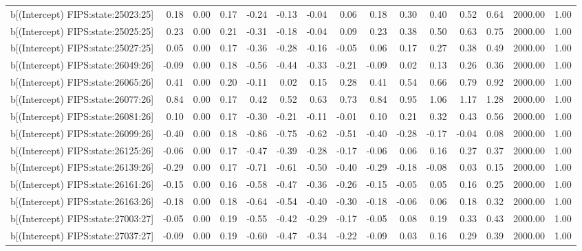 \begin{table}[ht]
\begin{tabular}{rrrrrrrrrrrrrrr}
  b[(Intercept) FIPS:state:25023:25] & 0.18 & 0.00 & 0.17 & -0.24 & -0.13 & -0.04 & 0.06 & 0.18 & 0.30 & 0.40 & 0.52 & 0.64 & 2000.00 & 1.00 \\ 
  b[(Intercept) FIPS:state:25025:25] & 0.23 & 0.00 & 0.21 & -0.31 & -0.18 & -0.04 & 0.09 & 0.23 & 0.38 & 0.50 & 0.63 & 0.75 & 2000.00 & 1.00 \\ 
  b[(Intercept) FIPS:state:25027:25] & 0.05 & 0.00 & 0.17 & -0.36 & -0.28 & -0.16 & -0.05 & 0.06 & 0.17 & 0.27 & 0.38 & 0.49 & 2000.00 & 1.00 \\ 
  b[(Intercept) FIPS:state:26049:26] & -0.09 & 0.00 & 0.18 & -0.56 & -0.44 & -0.33 & -0.21 & -0.09 & 0.02 & 0.13 & 0.26 & 0.36 & 2000.00 & 1.00 \\ 
  b[(Intercept) FIPS:state:26065:26] & 0.41 & 0.00 & 0.20 & -0.11 & 0.02 & 0.15 & 0.28 & 0.41 & 0.54 & 0.66 & 0.79 & 0.92 & 2000.00 & 1.00 \\ 
  b[(Intercept) FIPS:state:26077:26] & 0.84 & 0.00 & 0.17 & 0.42 & 0.52 & 0.63 & 0.73 & 0.84 & 0.95 & 1.06 & 1.17 & 1.28 & 2000.00 & 1.00 \\ 
  b[(Intercept) FIPS:state:26081:26] & 0.10 & 0.00 & 0.17 & -0.30 & -0.21 & -0.11 & -0.01 & 0.10 & 0.21 & 0.32 & 0.43 & 0.56 & 2000.00 & 1.00 \\ 
  b[(Intercept) FIPS:state:26099:26] & -0.40 & 0.00 & 0.18 & -0.86 & -0.75 & -0.62 & -0.51 & -0.40 & -0.28 & -0.17 & -0.04 & 0.08 & 2000.00 & 1.00 \\ 
  b[(Intercept) FIPS:state:26125:26] & -0.06 & 0.00 & 0.17 & -0.47 & -0.39 & -0.28 & -0.17 & -0.06 & 0.06 & 0.16 & 0.27 & 0.37 & 2000.00 & 1.00 \\ 
  b[(Intercept) FIPS:state:26139:26] & -0.29 & 0.00 & 0.17 & -0.71 & -0.61 & -0.50 & -0.40 & -0.29 & -0.18 & -0.08 & 0.03 & 0.15 & 2000.00 & 1.00 \\ 
  b[(Intercept) FIPS:state:26161:26] & -0.15 & 0.00 & 0.16 & -0.58 & -0.47 & -0.36 & -0.26 & -0.15 & -0.05 & 0.05 & 0.16 & 0.25 & 2000.00 & 1.00 \\ 
  b[(Intercept) FIPS:state:26163:26] & -0.18 & 0.00 & 0.18 & -0.64 & -0.54 & -0.40 & -0.30 & -0.18 & -0.06 & 0.06 & 0.18 & 0.32 & 2000.00 & 1.00 \\ 
  b[(Intercept) FIPS:state:27003:27] & -0.05 & 0.00 & 0.19 & -0.55 & -0.42 & -0.29 & -0.17 & -0.05 & 0.08 & 0.19 & 0.33 & 0.43 & 2000.00 & 1.00 \\ 
  b[(Intercept) FIPS:state:27037:27] & -0.09 & 0.00 & 0.19 & -0.60 & -0.47 & -0.34 & -0.22 & -0.09 & 0.03 & 0.16 & 0.29 & 0.39 & 2000.00 & 1.00 \\ 

\end{tabular}
\end{table}
